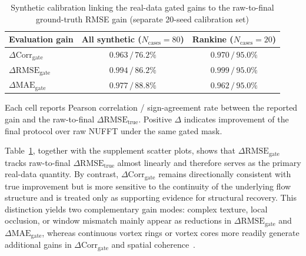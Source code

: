 \documentclass[lettersize,journal]{IEEEtran}
\begin{document}
\begin{table}[!htbp]
  \renewcommand{\arraystretch}{1.15}
  \caption{Synthetic calibration linking the real-data gated gains to the
    raw-to-final ground-truth RMSE gain
    (separate 20-seed calibration set)}
  \label{tab:proxy_calibration}
  \centering
  \scriptsize
  \setlength{\tabcolsep}{3.2pt}
  \begin{threeparttable}
    \begin{tabular}{@{}lcc@{}}
      \toprule
      Evaluation gain & All synthetic ($N_{\mathrm{cases}}=80$) & Rankine ($N_{\mathrm{cases}}=20$) \\
      \midrule
      $\Delta \mathrm{Corr}_{\mathrm{gate}}$ & $0.963 \,/\, 76.2\%$ & $0.970 \,/\, 95.0\%$ \\
      $\Delta \mathrm{RMSE}_{\mathrm{gate}}$ & $0.994 \,/\, 86.2\%$ & $0.999 \,/\, 95.0\%$ \\
      $\Delta \mathrm{MAE}_{\mathrm{gate}}$ & $0.977 \,/\, 88.8\%$ & $0.962 \,/\, 95.0\%$ \\
      \bottomrule
    \end{tabular}
    \begin{tablenotes}
      \footnotesize
      \item Each cell reports Pearson correlation / sign-agreement rate
            between the reported gain and the raw-to-final
            $\Delta\mathrm{RMSE}_{\mathrm{true}}$.
            Positive $\Delta$ indicates improvement of the final protocol
            over raw NUFFT under the same gated mask.
    \end{tablenotes}
  \end{threeparttable}
\end{table}

Table~\ref{tab:proxy_calibration}, together with the supplement scatter plots, shows that $\Delta\mathrm{RMSE}_{\mathrm{gate}}$ tracks raw-to-final $\Delta\mathrm{RMSE}_{\mathrm{true}}$ almost linearly and therefore serves as the primary real-data quantity.
By contrast, $\Delta\mathrm{Corr}_{\mathrm{gate}}$ remains directionally consistent with true improvement but is more sensitive to the continuity of the underlying flow structure and is treated only as supporting evidence for structural recovery.
This distinction yields two complementary gain modes: complex texture, local occlusion, or window mismatch mainly appear as reductions in $\Delta\mathrm{RMSE}_{\mathrm{gate}}$ and $\Delta\mathrm{MAE}_{\mathrm{gate}}$, whereas continuous vortex rings or vortex cores more readily generate additional gains in $\Delta\mathrm{Corr}_{\mathrm{gate}}$ and spatial coherence~\cite{Shan2025Lightweight,Choi2023SpatialRefinement,Elrefaie2024StereoPIV}.
\end{document}
